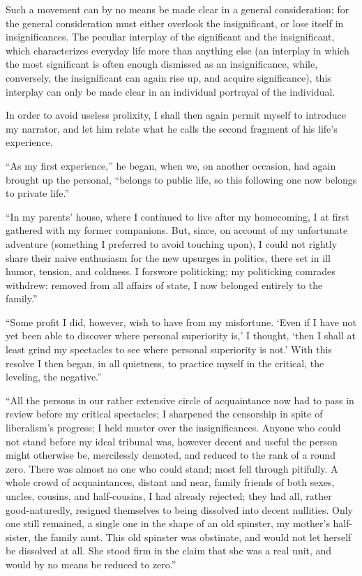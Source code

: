 \documentclass[12pt,a4paper]{book}
\begin{document}
Such a movement can by no means be made clear in a general consideration; for the general consideration must either overlook the insignificant, or lose itself in insignificances. The peculiar interplay of the significant and the insignificant, which characterizes everyday life more than anything else (an interplay in which the most significant is often enough dismissed as an insignificance, while, conversely, the insignificant can again rise up, and acquire significance), this interplay can only be made clear in an individual portrayal of the individual.

In order to avoid useless prolixity, I shall then again permit myself to introduce my narrator, and let him relate what he calls the second fragment of his life's experience.

``As my first experience,'' he began, when we, on another occasion, had again brought up the personal, ``belongs to public life, so this following one now belongs to private life.''

``In my parents' house, where I continued to live after my homecoming, I at first gathered with my former companions. But, since, on account of my unfortunate adventure (something I preferred to avoid touching upon), I could not rightly share their naive enthusiasm for the new upsurges in politics, there set in ill humor, tension, and coldness. I forswore politicking; my politicking comrades withdrew: removed from all affairs of state, I now belonged entirely to the family.''

``Some profit I did, however, wish to have from my misfortune. `Even if I have not yet been able to discover where personal superiority is,' I thought, `then I shall at least grind my spectacles to see where personal superiority is not.' With this resolve I then began, in all quietness, to practice myself in the critical, the leveling, the negative.''

``All the persons in our rather extensive circle of acquaintance now had to pass in review before my critical spectacles; I sharpened the censorship in spite of liberalism's progress; I held muster over the insignificances. Anyone who could not stand before my ideal tribunal was, however decent and useful the person might otherwise be, mercilessly demoted, and reduced to the rank of a round zero. There was almost no one who could stand; most fell through pitifully. A whole crowd of acquaintances, distant and near,
family friends of both sexes, uncles, cousins, and half-cousins, I had already rejected; they had all, rather good-naturedly, resigned themselves to being dissolved into decent nullities. Only one still remained, a single one in the shape of an old spinster, my mother's half-sister, the family aunt. This old spinster was obstinate, and would not let herself be dissolved at all. She stood firm in the claim that she was a real unit, and would by no means be reduced to zero.''
\end{document}

